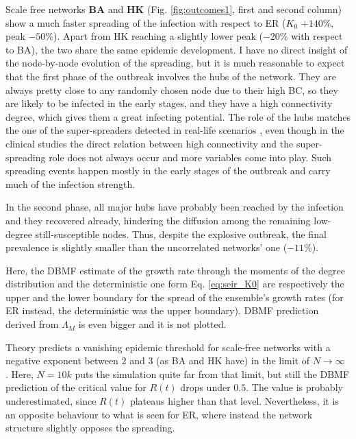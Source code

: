\documentclass[DIV=12, BCOR=0pt]{scrartcl}  %
\begin{document}
  Scale free networks \textbf{BA} and \textbf{HK} (Fig. \ref{fig:outcomes1}, first and second column) show a much faster spreading of the infection with respect to ER ($K_0$ $+ 140 \%$, peak $- 50 \%$). Apart from HK reaching a slightly lower peak ($- 20 \%$ with respect to BA), the two share the same epidemic development.
  I have no direct insight of the node-by-node evolution of the spreading, but it is much reasonable to expect that the first phase of the outbreak involves the hubs of the network. They are always pretty close to any randomly chosen node due to their high BC, so they are likely to be infected in the early stages, and they have a high connectivity degree, which gives them a great infecting potential. The role of the hubs matches the one of the super-spreaders detected in real-life scenarios \citep{Kissler2018}, even though in the clinical studies the direct relation between high connectivity and the super-spreading role does not always occur and more variables come into play. %
  Such spreading events happen mostly in the early stages of the outbreak and carry much of the infection strength.
  
  In the second phase, all major hubs have probably been reached by the infection and they recovered already, hindering the diffusion among the remaining low-degree still-susceptible nodes. Thus, despite the explosive outbreak, the final prevalence is slightly smaller than the uncorrelated networks' one ($- 11 \%$).
  
  Here, the DBMF estimate of the growth rate through the moments of the degree distribution and the deterministic one form Eq. \ref{eq:seir_K0} are respectively the upper and the lower boundary for the spread of the ensemble's growth rates (for ER instead, the deterministic was the upper boundary). DBMF prediction derived from $\Lambda_M$ is even bigger and it is not plotted. 
  
  Theory predicts a vanishing epidemic threshold for scale-free networks with a negative exponent between $2$ and $3$ (as BA and HK have) in the limit of $N \rightarrow \infty$ \citep{PastorSatorras}. Here, $N=10k$ puts the simulation quite far from that limit, but still the DBMF prediction of the critical value for $R(t)$ drops under $0.5$. The value is probably underestimated, since $R(t)$ plateaus higher than that level. Nevertheless, it is an opposite behaviour to what is seen for ER, where instead the network structure slightly opposes the spreading.
  
\end{document}
